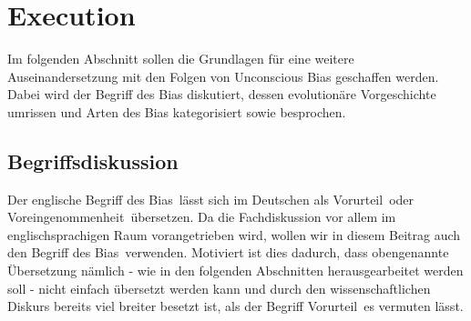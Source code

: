 \newpage
\section{Execution}
Im folgenden Abschnitt sollen die Grundlagen für eine weitere Auseinandersetzung mit den Folgen von Unconscious Bias geschaffen werden. Dabei wird der Begriff des Bias diskutiert, dessen evolutionäre Vorgeschichte umrissen und Arten des Bias kategorisiert sowie besprochen.\\

\subsection{Begriffsdiskussion}
Der englische Begriff des \glqq Bias\grqq~lässt sich im Deutschen als \glqq Vorurteil\grqq~oder \glqq Voreingenommenheit\grqq~übersetzen. Da die Fachdiskussion vor allem im englischsprachigen Raum vorangetrieben wird, wollen wir in diesem Beitrag auch den Begriff des \glqq Bias\grqq~verwenden. Motiviert ist dies dadurch, dass obengenannte Übersetzung nämlich - wie in den folgenden Abschnitten herausgearbeitet werden soll - nicht einfach übersetzt werden kann und durch den wissenschaftlichen Diskurs bereits viel breiter besetzt ist, als der Begriff \glqq Vorurteil\grqq~es vermuten lässt. \\
